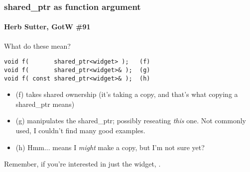 
\begin{frame}[fragile]
\frametitle{shared\_ptr as function argument}
\framesubtitle{Herb Sutter, GotW \#91}
What do these mean?
{\scriptsize\begin{verbatim}
void f(       shared_ptr<widget> );   (f)
void f(       shared_ptr<widget>& );  (g)
void f( const shared_ptr<widget>& );  (h)
\end{verbatim}
}
\begin{itemize}
\pause{}
\item (f) takes shared ownership (it's taking a copy, and that's what
  copying a shared\_ptr means)
\pause{}
\item (g) manipulates the shared\_ptr; possibly reseating \emph{this}
  one.  Not commonly used, I couldn't find many good examples.
\pause{}
\item (h) Hmm... means I \emph{might} make a copy, but I'm not sure yet?
\end{itemize}
\vskip 12pt
\pause{}
Remember, if you're interested in just the widget, .

\end{frame}



